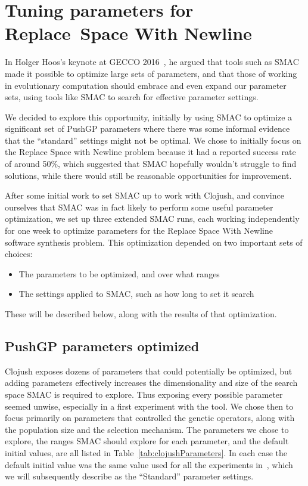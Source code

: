 \section{Tuning parameters for Replace~Space With Newline}
\label{sec:tuningRSWN}

In Holger Hoos's keynote at GECCO 
2016~\cite{Hoos:2016:TCM:2908812.2908960}, he argued that tools such as
SMAC made it possible to optimize large sets of parameters, and that those
of working in evolutionary computation should embrace and even expand
our parameter sets, using tools like SMAC to search for effective parameter
settings.

We decided to explore this opportunity, initially by using SMAC to optimize
a significant set of PushGP parameters where there was some informal
evidence that the ``standard'' settings might not be optimal. We chose to
initially focus on the Replace Space with Newline problem because it had a
reported success rate of around 50\%, which suggested that SMAC hopefully
wouldn't struggle to find solutions, while there would still be reasonable
opportunities for improvement.

After some initial work to set SMAC up to work with Clojush, and convince
ourselves that SMAC was in fact likely to perform some useful parameter
optimization, we set up three extended SMAC runs, each working independently
for one week to optimize parameters for the Replace Space With Newline software synthesis problem.
This optimization depended on two important sets of choices:
\begin{itemize}
	\item The parameters to be optimized, and over what ranges
	\item The settings applied to SMAC, such as how long to set it search
\end{itemize}
These will be described below, along with the results of that optimization.

\subsection{PushGP parameters optimized}
\label{sec:parametersOptimized}

Clojush exposes dozens of parameters that could potentially be optimized, but
adding parameters effectively increases the dimensionality and size of the
search space SMAC is required to explore. Thus exposing every possible parameter
seemed unwise, especially in a first experiment with the tool. We chose then
to focus primarily on parameters that controlled the genetic operators, along
with the population size and the selection mechanism. The parameters we chose 
to explore, the ranges SMAC should explore for each parameter, and the 
default initial values, are all listed in Table~\ref{tab:clojushParameters}.
In each case the default initial value was the same value used for all the
experiments in~\cite{Helmuth:2015:GECCO}, which we will subsequently
describe as the ``Standard'' parameter settings.

